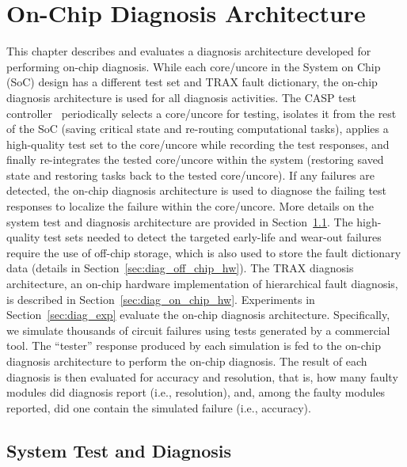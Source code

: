 \chapter{On-Chip Diagnosis Architecture}
\label{chap:diag}

This chapter describes and evaluates a diagnosis architecture developed for performing on-chip diagnosis.
%
While each core/uncore in the System on Chip (SoC) design has a different test set and TRAX fault dictionary, the on-chip diagnosis architecture is used for all diagnosis activities.
%
The CASP test controller~\cite{li08} periodically selects a core/uncore for testing, isolates it from the rest of the SoC (saving critical state and re-routing computational tasks), applies a high-quality test set to the core/uncore while recording the test responses, and finally re-integrates the tested core/uncore within the system (restoring saved state and restoring tasks back to the tested core/uncore).
%
If any failures are detected, the on-chip diagnosis architecture is used to diagnose the failing test responses to localize the failure within the core/uncore.
%
More details on the system test and diagnosis architecture are provided in Section~\ref{sec:diag_system_test_and_diag}.
%
The high-quality test sets needed to detect the targeted early-life and wear-out failures require the use of off-chip storage, which is also used to store the fault dictionary data (details in Section~\ref{sec:diag_off_chip_hw}).
%
The TRAX diagnosis architecture, an on-chip hardware implementation of hierarchical fault diagnosis, is described in Section~\ref{sec:diag_on_chip_hw}.
%
Experiments in Section~\ref{sec:diag_exp} evaluate the on-chip diagnosis architecture.
%
Specifically, we simulate thousands of circuit failures using tests generated by a commercial tool.
%
The ``tester'' response produced by each simulation is fed to the on-chip diagnosis architecture to perform the on-chip diagnosis.
%
The result of each diagnosis is then evaluated for accuracy and resolution, that is, how many faulty modules did diagnosis report (i.e., resolution), and, among the faulty modules reported, did one contain the simulated failure (i.e., accuracy).

\section{System Test and Diagnosis}
\label{sec:diag_system_test_and_diag}

